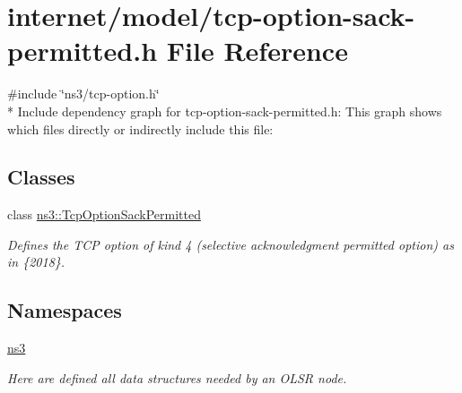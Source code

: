 \hypertarget{tcp-option-sack-permitted_8h}{}\section{internet/model/tcp-\/option-\/sack-\/permitted.h File Reference}
\label{tcp-option-sack-permitted_8h}
{\ttfamily \#include \char`\"{}ns3/tcp-\/option.\+h\char`\"{}}\\*
Include dependency graph for tcp-\/option-\/sack-\/permitted.h\+:
This graph shows which files directly or indirectly include this file\+:
\subsection*{Classes}
\begin{DoxyCompactItemize}
\item 
class \hyperlink{classns3_1_1TcpOptionSackPermitted}{ns3\+::\+Tcp\+Option\+Sack\+Permitted}
\begin{DoxyCompactList}\small\item\em Defines the T\+CP option of kind 4 (selective acknowledgment permitted option) as in \{2018\}. \end{DoxyCompactList}\end{DoxyCompactItemize}
\subsection*{Namespaces}
\begin{DoxyCompactItemize}
\item 
 \hyperlink{namespacens3}{ns3}
\begin{DoxyCompactList}\small\item\em Here are defined all data structures needed by an O\+L\+SR node. \end{DoxyCompactList}\end{DoxyCompactItemize}
